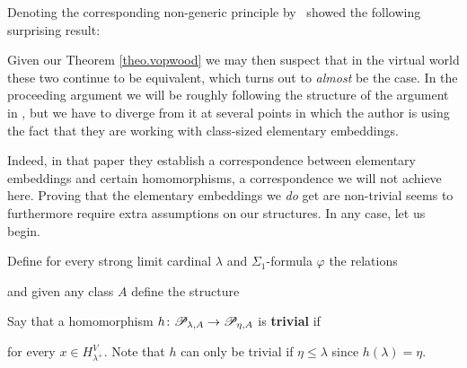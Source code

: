 \documentclass[../../main]{subfiles}
\begin{document}
Denoting the corresponding non-generic principle by \wvp\, \cite{WilsonWVP} showed the following surprising result:


Given our Theorem \ref{theo.vopwood} we may then suspect that in the virtual world these two continue to be equivalent, which turns out to \textit{almost} be the case. In the proceeding argument we will be roughly following the structure of the argument in \cite{WilsonWVP}, but we have to diverge from it at several points in which the author is using the fact that they are working with class-sized elementary embeddings. 

\qquad Indeed, in that paper they establish a correspondence between elementary embeddings and certain homomorphisms, a correspondence we will not achieve here. Proving that the elementary embeddings we \textit{do} get are non-trivial seems to furthermore require extra assumptions on our structures. In any case, let us begin.

\qquad Define for every strong limit cardinal $\lambda$ and $\Sigma_1$-formula $\varphi$ the relations

and given any class $A$ define the structure

Say that a homomorphism $h\colon\mathscr P_{\lambda,A}\to\mathscr P_{\eta,A}$ is \textbf{trivial} if
  
  for every $x\in H_{\lambda^+}^V$. Note that $h$ can only be trivial if $\eta\leq\lambda$ since $h(\lambda)=\eta$.
\end{document}

